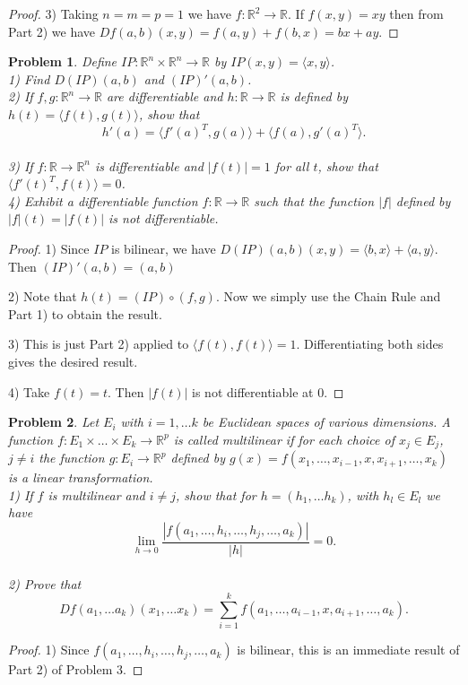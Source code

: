 \documentclass{article}
\newtheorem{problem}{Problem}
\begin{document}
\begin{flushleft}
\begin{proof}
3) Taking $n=m=p=1$ we have $f : \mathbb{R}^2 \rightarrow \mathbb{R}$. If $f(x,y) = xy$ then from Part 2) we have $Df(a,b)(x,y) = f(a,y) + f(b,x) = bx + ay$.
\end{proof}

\begin{problem}
Define $IP : \mathbb{R}^n \times \mathbb{R}^n \rightarrow \mathbb{R}$ by $IP(x,y) = \langle x, y \rangle$.\\
1) Find $D(IP)(a,b)$ and $(IP)'(a,b)$.\\
2) If $f,g : \mathbb{R}^n \rightarrow \mathbb{R}$ are differentiable and $h : \mathbb{R} \rightarrow \mathbb{R}$ is defined by $h(t) = \langle f(t), g(t) \rangle$, show that
\[
h'(a) = \langle f'(a)^T, g(a) \rangle + \langle f(a), g'(a)^T \rangle.
\]\\
3) If $f : \mathbb{R} \rightarrow \mathbb{R}^n$ is differentiable and $|f(t)| = 1$ for all $t$, show that $\langle f'(t)^T, f(t) \rangle = 0$.\\
4) Exhibit a differentiable function $f: \mathbb{R} \rightarrow \mathbb{R}$ such that the function $|f|$ defined by $|f|(t) = |f(t)|$ is not differentiable.
\end{problem}
\begin{proof}
1) Since $IP$ is bilinear, we have $D(IP)(a,b)(x,y) = \langle b,x \rangle + \langle a,y \rangle$. Then $(IP)'(a,b) = (a,b)$\newline

2) Note that $h(t) = (IP) \circ (f,g)$. Now we simply use the Chain Rule and Part 1) to obtain the result.\newline

3) This is just Part 2) applied to $\langle f(t), f(t) \rangle = 1$. Differentiating both sides gives the desired result.\newline

4) Take $f(t) = t$. Then $|f(t)|$ is not differentiable at $0$.
\end{proof}

\begin{problem}
Let $E_i$ with $i = 1, \dots k$ be Euclidean spaces of various dimensions. A function $f : E_1 \times \dots \times E_k \rightarrow \mathbb{R}^p$ is called multilinear if for each choice of $x_j \in E_j$, $j \neq i$ the function $g : E_i \rightarrow \mathbb{R}^p$ defined by $g(x) = f(x_1, \dots , x_{i-1}, x, x_{i+1}, \dots , x_k)$ is a linear transformation.\\
1) If $f$ is multilinear and $i \neq j$, show that for $h = (h_1, \dots h_k)$, with $h_l \in E_l$ we have
\[
\lim_{h \rightarrow 0} \frac{|f(a_1, \dots , h_i, \dots , h_j, \dots , a_k)|}{|h|} = 0.
\]\\
2) Prove that
\[
Df(a_1, \dots a_k)(x_1, \dots x_k) = \sum_{i=1}^k f(a_1, \dots , a_{i-1}, x, a_{i+1}, \dots , a_k).
\]
\end{problem}
\begin{proof}
1) Since $f(a_1, \dots , h_i, \dots , h_j, \dots , a_k)$ is bilinear, this is an immediate result of Part 2) of Problem 3.\newline


\end{proof}
\end{flushleft}
\end{document}
